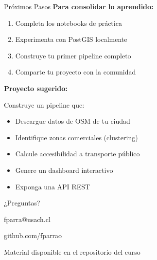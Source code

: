 \documentclass[10pt,aspectratio=169]{beamer}
\newcommand{\conceptbox}[2]{
\begin{tcolorbox}[colframe=usachblue,colback=blue!5,title=#1,fonttitle=\bfseries]
#2
\end{tcolorbox}
}
\begin{document}
\begin{frame}{Próximos Pasos}
    \textbf{Para consolidar lo aprendido:}
    \begin{enumerate}
        \item \faCode\space Completa los notebooks de práctica
        \item \faDatabase\space Experimenta con PostGIS localmente
        \item \faRocket\space Construye tu primer pipeline completo
        \item \faUsers\space Comparte tu proyecto con la comunidad
    \end{enumerate}
    
    \vspace{0.5cm}
    \textbf{Proyecto sugerido:}
    \conceptbox{Sistema de Análisis Urbano}{
        Construye un pipeline que:
        \begin{itemize}
            \item Descargue datos de OSM de tu ciudad
            \item Identifique zonas comerciales (clustering)
            \item Calcule accesibilidad a transporte público
            \item Genere un dashboard interactivo
            \item Exponga una API REST
        \end{itemize}
    }
\end{frame}

\begin{frame}[standout]
    \Huge ¿Preguntas?
    
    \vspace{1cm}
    \Large
    \faEnvelope\space fparra@usach.cl
    
    \faGithub\space github.com/fparrao
    
    \vspace{1cm}
    \normalsize
    Material disponible en el repositorio del curso
\end{frame}
\end{document}

